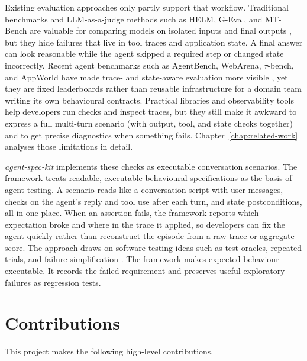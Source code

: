 Existing evaluation approaches only partly support that workflow. Traditional benchmarks and LLM-as-a-judge methods such as HELM, G-Eval, and MT-Bench are valuable for comparing models on isolated inputs and final outputs \citep{liang2022helm,liu2023geval,zheng2023judging}, but they hide failures that live in tool traces and application state. A final answer can look reasonable while the agent skipped a required step or changed state incorrectly. Recent agent benchmarks such as AgentBench, WebArena, $\tau$-bench, and AppWorld have made trace- and state-aware evaluation more visible \citep{liu2023agentbench,zhou2023webarena,yao2024taubench,trivedi2024appworld}, yet they are fixed leaderboards rather than reusable infrastructure for a domain team writing its own behavioural contracts. Practical libraries and observability tools help developers run checks and inspect traces, but they still make it awkward to express a full multi-turn scenario (with output, tool, and state checks together) and to get precise diagnostics when something fails. Chapter~\ref{chap:related-work} analyses those limitations in detail.

\emph{agent-spec-kit} implements these checks as executable conversation scenarios. The framework treats readable, executable behavioural specifications as the basis of agent testing. A scenario reads like a conversation script with user messages, checks on the agent's reply and tool use after each turn, and state postconditions, all in one place. When an assertion fails, the framework reports which expectation broke and where in the trace it applied, so developers can fix the agent quickly rather than reconstruct the episode from a raw trace or aggregate score. The approach draws on software-testing ideas such as test oracles, repeated trials, and failure simplification \citep{claessen2000quickcheck,barr2015oracle,zeller2002simplifying,ribeiro2020checklist}. The framework makes expected behaviour executable. It records the failed requirement and preserves useful exploratory failures as regression tests.

\section{Contributions}

This project makes the following high-level contributions.

